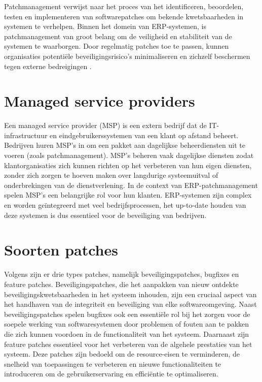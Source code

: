 Patchmanagement verwijst naar het proces van het identificeren, beoordelen, testen en implementeren van softwarepatches om bekende kwetsbaarheden in systemen te verhelpen. Binnen het domein van ERP-systemen, is patchmanagement van groot belang
om de veiligheid en stabiliteit van de systemen te waarborgen. Door regelmatig patches toe te passen, kunnen organisaties potentiële beveiligingsrisico's minimaliseren en zichzelf beschermen tegen externe bedreigingen \autocite{Buenning2024}.

\section{Managed service providers}

Een managed service provider (MSP) is een extern bedrijf dat de IT-infrastructuur en eindgebruikerssystemen van een klant op afstand beheert. Bedrijven huren MSP's in om een pakket aan dagelijkse beheerdiensten uit te voeren (zoals patchmanagement). MSP's beheren
vaak dagelijkse diensten zodat klantorganisaties zich kunnen richten op het verbeteren van hun eigen diensten, zonder zich zorgen te hoeven maken over langdurige systeemuitval of onderbrekingen van de dienstverlening.
In de context van ERP-patchmanagement spelen MSP's een belangrijke rol voor hun klanten. ERP-systemen zijn complex en worden geïntegreerd met veel bedrijfsprocessen, het up-to-date houden van deze systemen is dus essentieel voor de beveiliging van bedrijven. \autocite{Gillis2021}

\section{Soorten patches}
Volgens \textcite{Buenning2024} zijn er drie types patches, namelijk beveiligingspatches, bugfixes en feature patches. Beveiligingspatches, die het aanpakken van nieuw ontdekte beveiligingskwetsbaarheden in het systeem inhouden, zijn een cruciaal
aspect van het handhaven van de integriteit en beveiliging van elke softwareomgeving. Naast beveiligingspatches spelen bugfixes ook een essentiële rol bij het zorgen
voor de soepele werking van softwaresystemen door problemen of fouten aan te pakken die zich kunnen voordoen in de functionaliteit van het systeem. Daarnaast zijn feature patches essentieel voor het verbeteren van de algehele prestaties van het systeem. Deze patches zijn bedoeld om de resource-eisen te
verminderen, de snelheid van toepassingen te verbeteren en nieuwe functionaliteiten te introduceren om de gebruikerservaring en efficiëntie te optimaliseren. \\

